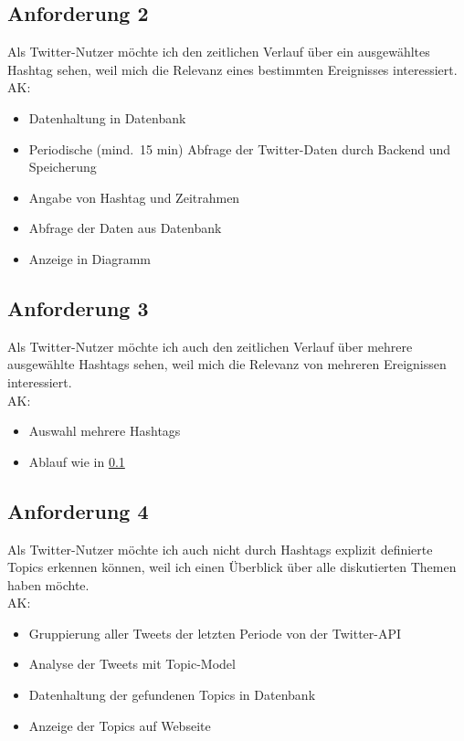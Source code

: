 \documentclass[conference]{IEEEtran}
\begin{document}
\subsection{Anforderung 2}
\label{2}
Als Twitter-Nutzer möchte ich den zeitlichen Verlauf über ein ausgewähltes Hashtag sehen,
weil mich die Relevanz eines bestimmten Ereignisses interessiert.
\\
AK:
\begin{itemize}
        \item Datenhaltung in Datenbank
        \item Periodische (mind.\ 15 min) Abfrage der Twitter-Daten durch Backend und Speicherung
        \item Angabe von Hashtag und Zeitrahmen
        \item Abfrage der Daten aus Datenbank
        \item Anzeige in Diagramm
\end{itemize}

\subsection{Anforderung 3}
Als Twitter-Nutzer möchte ich auch den zeitlichen Verlauf über mehrere ausgewählte Hashtags sehen,
weil mich die Relevanz von mehreren Ereignissen interessiert.
\\
AK:
\begin{itemize}
        \item Auswahl mehrere Hashtags
        \item Ablauf wie in \ref*{2}
\end{itemize}

\subsection{Anforderung 4}
Als Twitter-Nutzer möchte ich auch nicht durch Hashtags explizit definierte Topics erkennen können,
weil ich einen Überblick über alle diskutierten Themen haben möchte.
\\
AK:
\begin{itemize}
        \item Gruppierung aller Tweets der letzten Periode von der Twitter-API
        \item Analyse der Tweets mit Topic-Model
        \item Datenhaltung der gefundenen Topics in Datenbank
        \item Anzeige der Topics auf Webseite
\end{itemize}
\end{document}

